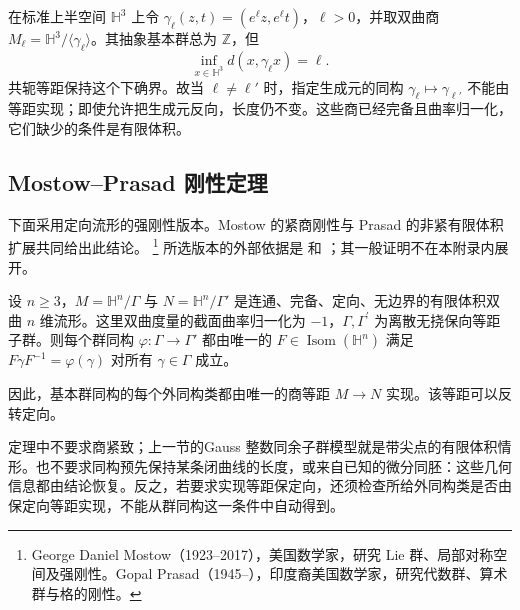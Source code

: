 \begin{example}\label{g3:exm:D-marked-cyclic-length}
	在标准上半空间 \(\mathbb H^3\) 上令 \(\gamma_\ell(z,t)=(e^\ell z,e^\ell t)\)，\(\ell>0\)，并取双曲商 \(M_\ell=\mathbb H^3/\langle\gamma_\ell\rangle\)。其抽象基本群总为 \(\mathbb Z\)，但
	\[
		\inf_{x\in\mathbb H^3}d(x,\gamma_\ell x)=\ell.
	\]
	共轭等距保持这个下确界。故当 \(\ell\ne\ell'\) 时，指定生成元的同构 \(\gamma_\ell\mapsto\gamma_{\ell'}\) 不能由等距实现；即使允许把生成元反向，长度仍不变。这些商已经完备且曲率归一化，它们缺少的条件是有限体积。
\end{example}

\subsection{Mostow–Prasad 刚性定理}
\label{g3:subsec:D05:02}

下面采用定向流形的强刚性版本。Mostow 的紧商刚性与 Prasad 的非紧有限体积扩展共同给出此结论。%
\footnote{George Daniel Mostow（1923--2017），美国数学家，研究 Lie 群、局部对称空间及强刚性。Gopal Prasad（1945--），印度裔美国数学家，研究代数群、算术群与格的刚性。}
所选版本的外部依据是 \cite[第1节，定理 A、A\(^{\prime}\) 及第9页]{Mostow1973StrongRigidity}和 \cite[定理 B，第256页]{Prasad1973StrongRigidity}；其一般证明不在本附录内展开。

\begin{theorem}\label{g3:thm:D-mostow-prasad}
	设 \(n\ge3\)，\(M=\mathbb H^n/\Gamma\) 与 \(N=\mathbb H^n/\Gamma'\) 是连通、完备、定向、无边界的有限体积双曲 \(n\) 维流形。这里双曲度量的截面曲率归一化为 \(-1\)，\(\Gamma,\Gamma^\prime\) 为离散无挠保向等距子群。则每个群同构 \(\varphi:\Gamma\to\Gamma'\) 都由唯一的 \(F\in\operatorname{Isom}(\mathbb H^n)\) 满足 \(F\gamma F^{-1}=\varphi(\gamma)\) 对所有 \(\gamma\in\Gamma\) 成立。

	因此，基本群同构的每个外同构类都由唯一的商等距 \(M\to N\) 实现。该等距可以反转定向。
\end{theorem}

定理中不要求商紧致；上一节的Gauss 整数同余子群模型就是带尖点的有限体积情形。也不要求同构预先保持某条闭曲线的长度，或来自已知的微分同胚：这些几何信息都由结论恢复。反之，若要求实现等距保定向，还须检查所给外同构类是否由保定向等距实现，不能从群同构这一条件中自动得到。

